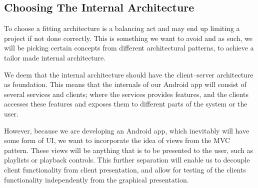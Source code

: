 \subsection{Choosing The Internal Architecture}
To choose a fitting architecture is a balancing act and may end up limiting a project if not done correctly.
This is something we want to avoid and as such, we will be picking certain concepts from different architectural patterns, to achieve a tailor made internal architecture.

We deem that the internal architecture should have the client--server architecture as foundation.
This means that the internals of our Android app will consist of several services and clients;
where the services provides features, and the clients accesses these features and exposes them to different parts of the system or the user.

However, because we are developing an Android app, which inevitably will have some form of \ac{UI}, we want to incorporate the idea of views from the \ac{MVC} pattern.
These views will be anything that is to be presented to the user, such as playlists or playback controls.
This further separation will enable us to decouple client functionality from client presentation, and allow for testing of the clients functionality independently from the graphical presentation.


